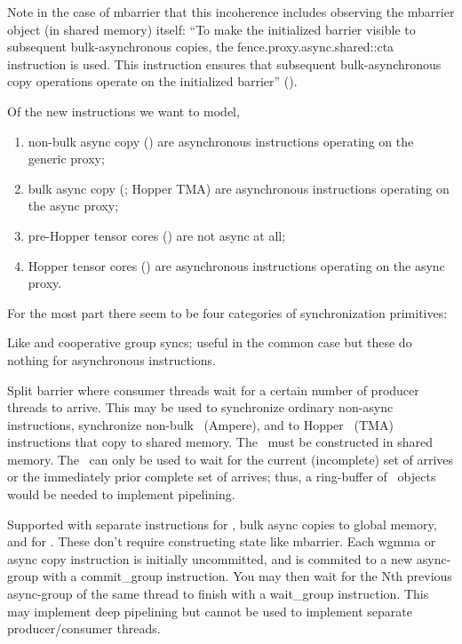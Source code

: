 Note in the case of mbarrier that this incoherence includes observing the mbarrier object (in shared memory) itself: ``To make the initialized barrier visible to subsequent bulk-asynchronous copies, the fence.proxy.async.shared::cta instruction is used. This instruction ensures that subsequent bulk-asynchronous copy operations operate on the initialized barrier'' ().

\filbreak
Of the new instructions we want to model,

\begin{enumerate}
  \item non-bulk async copy (\cpAsync) are asynchronous instructions operating on the generic proxy;
  \item bulk async copy (\cpAsyncBulk; Hopper TMA) are asynchronous instructions operating on the async proxy;
  \item pre-Hopper tensor cores () are not async at all;
  \item Hopper tensor cores (\wgmma) are asynchronous instructions operating on the async proxy.
\end{enumerate}

\filbreak
For the most part there seem to be four categories of synchronization primitives:

\filbreak
{} Like  and cooperative group syncs; useful in the common case but these do nothing for asynchronous instructions.

\filbreak
{} Split barrier where consumer threads wait for a certain number of producer threads to arrive.
This may be used to synchronize ordinary non-async instructions, synchronize non-bulk \cpAsync\ (Ampere), and to Hopper \cpAsyncBulk\ (TMA) instructions that copy to shared memory.
The \mbarrier\ must be constructed in shared memory.
The \mbarrier\ can only be used to wait for the current (incomplete) set of arrives or the immediately prior complete set of arrives; thus, a ring-buffer of \mbarrier\ objects would be needed to implement pipelining.

\filbreak
{} Supported with separate instructions for , bulk async copies to global memory, and for .
These don't require constructing state like mbarrier.
Each wgmma or async copy instruction is initially uncommitted, and is commited to a new async-group with a commit\_group instruction.
You may then wait for the Nth previous async-group of the same thread to finish with a wait\_group instruction.
This may implement deep pipelining but cannot be used to implement separate producer/consumer threads.


